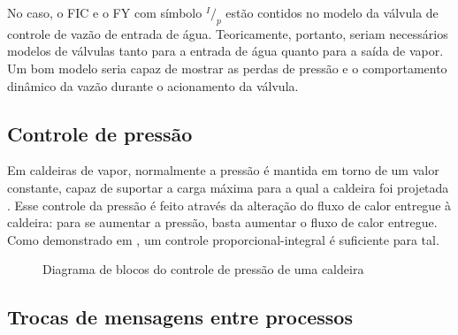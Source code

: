 No caso, o FIC e o FY com símbolo $^I/_p$ estão contidos no modelo da
válvula de controle de vazão de entrada de água. Teoricamente,
portanto, seriam necessários modelos de válvulas tanto para a entrada
de água quanto para a saída de vapor. Um bom modelo seria capaz de
mostrar as perdas de pressão e o comportamento dinâmico da vazão
durante o acionamento da válvula.

\subsection{Controle de pressão}

Em caldeiras de vapor, normalmente a pressão é mantida em torno de um
valor constante, capaz de suportar a carga máxima para a qual a
caldeira foi projetada \cite{brantly1942steam}. Esse controle da
pressão é feito através da alteração do fluxo de calor entregue à
caldeira: para se aumentar a pressão, basta aumentar o fluxo de calor
entregue. Como demonstrado em \cite{controle-pressao}, um controle
proporcional-integral é suficiente para tal.

\begin{figure}[htb]
  \caption{\label{blocospressao} Diagrama de blocos do controle de
    pressão de uma caldeira}
  \begin{center}
  \end{center}
\end{figure}


\subsection{Trocas de mensagens entre processos}

